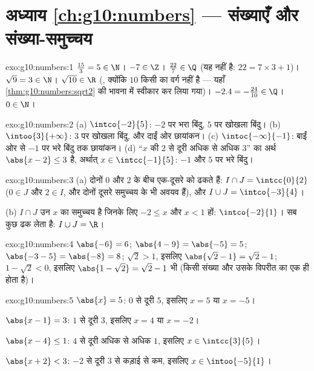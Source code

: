 \section*{अध्याय \ref{ch:g10:numbers} --- संख्याएँ और संख्या-समुच्चय}

\begin{solution}{exo:g10:numbers:1}
$\frac{15}{3} = 5 \in \N$। \quad $-7 \in \Z$। \quad
$\frac{22}{7} \in \Q$ (यह  नहीं है: $22 = 7 \times 3 + 1$)।
\quad $\sqrt 9 = 3 \in \N$। \quad $\sqrt{10} \in \R$ (, क्योंकि $10$ किसी  का वर्ग नहीं
है --- यहाँ \cref{thm:g10:numbers:sqrt2} की भावना में स्वीकार कर लिया गया)। \quad $-2.4 = -\frac{24}{10} \in \Q$।
\quad $0 \in \N$।
\end{solution}

\begin{solution}{exo:g10:numbers:2}
(a) $\intco{-2}{5}$: $-2$ पर भरा बिंदु, $5$ पर खोखला बिंदु।
(b) $\intoo{3}{+\infty}$: $3$ पर खोखला बिंदु, और दाईं ओर छायांकन।
(c) $\intoc{-\infty}{-1}$: बाईं ओर से $-1$ पर भरे बिंदु तक छायांकन।
(d) ``$x$ की $2$ से दूरी अधिक से अधिक $3$'' का अर्थ $\abs{x - 2} \leq 3$ है, अर्थात्
$x \in \intcc{-1}{5}$: $-1$ और $5$ पर भरे बिंदु।
\end{solution}

\begin{solution}{exo:g10:numbers:3}
(a) दोनों  $0$ और $2$ के बीच एक-दूसरे को ढकते हैं: $I \cap J = \intcc{0}{2}$ ($0 \in J$ और
$2 \in I$, और दोनों दूसरे समुच्चय के भी अवयव हैं), और $I \cup J = \intco{-3}{4}$।

(b) $I \cap J$ उन $x$ का समुच्चय है जिनके लिए $-2 \leq x$ और $x < 1$ हों: $\intco{-2}{1}$। 
सब कुछ ढक लेता है: $I \cup J = \R$।
\end{solution}

\begin{solution}{exo:g10:numbers:4}
$\abs{-6} = 6$; \quad $\abs{4 - 9} = \abs{-5} = 5$; \quad
$\abs{-3 - 5} = \abs{-8} = 8$; \quad
$\sqrt 2 > 1$, इसलिए $\abs{\sqrt2 - 1} = \sqrt2 - 1$; \quad
$1 - \sqrt2 < 0$, इसलिए $\abs{1 - \sqrt2} = \sqrt2 - 1$ भी (किसी संख्या और उसके विपरीत का  एक ही होता
है)।
\end{solution}

\begin{solution}{exo:g10:numbers:5}
$\abs{x} = 5$: $0$ से दूरी $5$, इसलिए $x = 5$ या $x = -5$।

$\abs{x - 1} = 3$: $1$ से दूरी $3$, इसलिए $x = 4$ या $x = -2$।

$\abs{x - 4} \leq 1$: $4$ से दूरी अधिक से अधिक $1$, इसलिए $x \in \intcc{3}{5}$।

$\abs{x + 2} < 3$: $-2$ से दूरी $3$ से कड़ाई से कम, इसलिए $x \in \intoo{-5}{1}$।
\end{solution}

